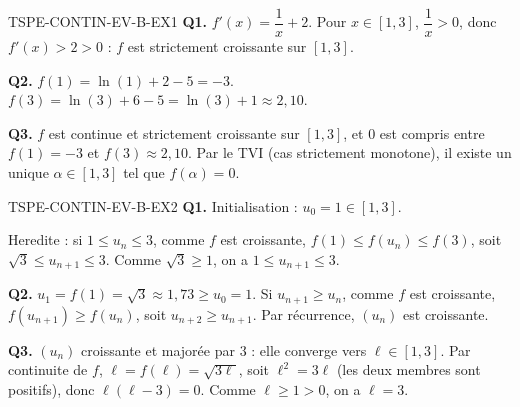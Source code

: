 \begin{corrige}{TSPE-CONTIN-EV-B-EX1}
\textbf{Q1.} $f'(x) = \dfrac{1}{x} + 2$. Pour $x \in [1,3]$, $\dfrac{1}{x} > 0$, donc $f'(x) > 2 > 0$ : $f$ est strictement croissante sur $[1,3]$.

\textbf{Q2.} $f(1) = \ln(1) + 2 - 5 = -3$. $f(3) = \ln(3) + 6 - 5 = \ln(3) + 1 \approx 2{,}10$.

\textbf{Q3.} $f$ est continue et strictement croissante sur $[1,3]$, et $0$ est compris entre $f(1)=-3$ et $f(3)\approx 2{,}10$. Par le TVI (cas strictement monotone), il existe un unique $\alpha \in [1,3]$ tel que $f(\alpha)=0$.
\end{corrige}

\begin{corrige}{TSPE-CONTIN-EV-B-EX2}
\textbf{Q1.} Initialisation : $u_0 = 1 \in [1,3]$.

Heredite : si $1 \leq u_n \leq 3$, comme $f$ est croissante, $f(1) \leq f(u_n) \leq f(3)$, soit $\sqrt{3} \leq u_{n+1} \leq 3$. Comme $\sqrt{3} \geq 1$, on a $1 \leq u_{n+1} \leq 3$.

\textbf{Q2.} $u_1 = f(1) = \sqrt{3} \approx 1{,}73 \geq u_0 = 1$. Si $u_{n+1} \geq u_n$, comme $f$ est croissante, $f(u_{n+1}) \geq f(u_n)$, soit $u_{n+2} \geq u_{n+1}$. Par récurrence, $(u_n)$ est croissante.

\textbf{Q3.} $(u_n)$ croissante et majorée par $3$ : elle converge vers $\ell \in [1,3]$. Par continuite de $f$, $\ell = f(\ell) = \sqrt{3\ell}$, soit $\ell^2 = 3\ell$ (les deux membres sont positifs), donc $\ell(\ell-3)=0$. Comme $\ell \geq 1 > 0$, on a $\ell = 3$.
\end{corrige}
